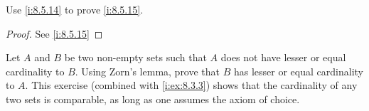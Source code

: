 \begin{ex}\label{i:ex:8.5.14}
  Use \cref{i:8.5.14} to prove \cref{i:8.5.15}.
\end{ex}

\begin{proof}
  See \cref{i:8.5.15}
\end{proof}

\begin{ex}\label{i:ex:8.5.15}
  Let \(A\) and \(B\) be two non-empty sets such that \(A\) does not have lesser or equal cardinality to \(B\).
  Using Zorn's lemma, prove that \(B\) has lesser or equal cardinality to \(A\).
  This exercise (combined with \cref{i:ex:8.3.3}) shows that the cardinality of any two sets is comparable, as long as one assumes the axiom of choice.
\end{ex}

